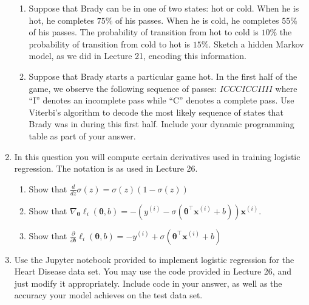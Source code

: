 \documentclass[10pt]{article}
\begin{document}
\begin{enumerate}
\begin{enumerate}
	\item Suppose that Brady can be in one of two states: hot or cold. When he is hot, he completes $75\%$ of his passes. When he is cold, he completes $55\%$ of his passes. The probability of transition from hot to cold is $10\%$ the probability of transition from cold to hot is $15\%$. Sketch a hidden Markov model, as we did in Lecture 21, encoding this information. \vfill
	\item Suppose that Brady starts a particular game hot. In the first half of the game, we observe the following sequence of passes: $ICCCICCIIII$ where ``I'' denotes an incomplete pass while ``C'' denotes a complete pass. Use Viterbi's algorithm to decode the most likely sequence of states that Brady was in during this first half. Include your dynamic programming table as part of your answer. \vfill
\end{enumerate}


\item In this question you will compute certain derivatives used in training logistic regression. The notation is as used in Lecture 26.

\begin{enumerate}
	\item Show that $\displaystyle \frac{d}{dz}\sigma(z) = \sigma(z)\left(1-\sigma(z)\right)$ \\
	\item Show that $\displaystyle \nabla_{\boldsymbol{\theta}}\ell_{i}(\boldsymbol{\theta},b) = -\left(y^{(i)} - \sigma\left(\boldsymbol{\theta}^{\top}\mathbf{x}^{(i)} + b\right)\right)\mathbf{x}^{(i)} $. \\
	\item Show that $\displaystyle \frac{\partial}{\partial b}\ell_{i}(\boldsymbol{\theta},b) = -y^{(i)} + \sigma\left(\boldsymbol{\theta}^{\top}\mathbf{x}^{(i)} + b\right)$ \\
\end{enumerate}

\item Use the Jupyter notebook provided to implement logistic regression for the Heart Disease data set.  You may use the code provided in Lecture 26, and just modify it appropriately. Include code in your answer, as well as the accuracy your model achieves on the test data set. \\


\end{enumerate}
\end{document}
